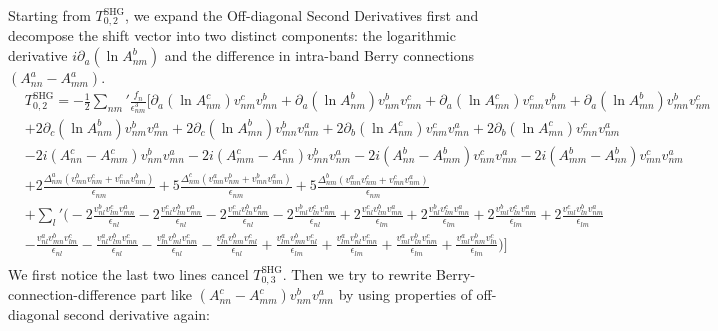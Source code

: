 \documentclass[twocolumn, prx, reprint, amsfonts, amsmath, amssymb, longbibliography, floatfix, aps]{revtex4-2}
\begin{document}
Starting from $T^{\text{SHG}}_{0, 2}$, we expand the Off-diagonal Second Derivatives first and decompose the shift vector into two distinct components: the logarithmic derivative $i\partial_{a} (\ln A^{b}_{nm})$ and the difference in intra-band Berry connections $(A^{a}_{nn} - A^{a}_{mm})$.
\begin{equation}
	\begin{aligned}
		&T^{\text{SHG}}_{0, 2} =- \frac{1}{2} {\textstyle \sum_{nm}'} \frac{f_n}{\epsilon^3_{nm}}\Big[\partial_a(\ln A^{c}_{nm}) v^c_{nm} v^{b}_{mn} + \partial_a(\ln A^{b}_{nm}) v^b_{nm} v^{c}_{mn} + \partial_a(\ln A^{c}_{mn}) v^c_{mn} v^{b}_{nm} + \partial_a(\ln A^{b}_{mn}) v^b_{mn} v^{c}_{nm} \\
		&+ 2\partial_c(\ln A^{b}_{nm}) v^b_{nm} v^{a}_{mn} + 2\partial_c(\ln A^{b}_{mn}) v^b_{mn} v^{a}_{nm} + 2\partial_b(\ln A^{c}_{nm}) v^c_{nm} v^{a}_{mn} + 2\partial_b(\ln A^{c}_{mn}) v^c_{mn} v^{a}_{nm}\\
		& -2i (A^c_{nn} - A^c_{mm})v^b_{nm} v^{a}_{mn}-2i (A^c_{mm} - A^c_{nn})v^b_{mn} v^{a}_{nm} -2i (A^b_{nn} - A^b_{mm})v^c_{nm} v^{a}_{mn}-2i (A^b_{mm} - A^b_{nn})v^c_{mn} v^{a}_{nm}\\
		& + 2\frac{\Delta_{nm}^a (v^b_{mn}v^c_{nm} + v^c_{mn}v^b_{nm})}{\epsilon_{nm}} + 5\frac{\Delta_{nm}^c (v^a_{mn}v^b_{nm} + v^b_{mn}v^a_{nm})}{\epsilon_{nm}} + 5\frac{\Delta_{nm}^b (v^a_{mn}v^c_{nm} + v^c_{mn}v^a_{nm})}{\epsilon_{nm}} \\
		&+ {\textstyle \sum_{l}'} \Big(
		-2\frac{v^b_{nl}v^c_{lm}v^a_{mn}}{\epsilon_{nl}} - 2\frac{v^c_{nl}v^b_{lm}v^a_{mn}}{\epsilon_{nl}} -
		2\frac{v^c_{ml}v^b_{ln}v^a_{nm}}{\epsilon_{nl}} - 
		2\frac{v^b_{ml}v^c_{ln}v^a_{nm}}{\epsilon_{nl}} 
        + 2\frac{v^c_{nl}v^b_{lm}v^a_{mn}}{\epsilon_{lm}} + 2\frac{v^b_{nl}v^c_{lm}v^a_{mn}}{\epsilon_{lm}} +
		2\frac{v^b_{ml}v^c_{ln}v^a_{nm}}{\epsilon_{lm}} + 
		2\frac{v^c_{ml}v^b_{ln}v^a_{nm}}{\epsilon_{lm}} \\
		&-\frac{v^{a}_{nl}v^b_{mn}v^c_{lm}}{\epsilon_{nl}} - \frac{v^{a}_{nl}v^b_{lm}v^c_{mn}}{\epsilon_{nl}} -
		\frac{v^{a}_{ln}v^b_{ml}v^c_{nm}}{\epsilon_{nl}} - 
		\frac{v^{a}_{ln}v^b_{nm}v^c_{ml}}{\epsilon_{nl}}
        + \frac{v^{a}_{lm}v^b_{mn}v^c_{nl}}{\epsilon_{lm}} + \frac{v^{a}_{lm}v^b_{nl}v^c_{mn}}{\epsilon_{lm}} +
		\frac{v^{a}_{ml}v^b_{ln}v^c_{nm}}{\epsilon_{lm}} + 
		\frac{v^{a}_{ml}v^b_{nm}v^c_{ln}}{\epsilon_{lm}}\Big)\Big]\\
	\end{aligned}
\end{equation}
We first notice the last two lines cancel $T^{\text{SHG}}_{0, 3}$. Then we try to rewrite Berry-connection-difference part like $(A^c_{nn} - A^c_{mm})v^b_{nm} v^{a}_{mn}$ by using properties of off-diagonal second derivative again:
\end{document}
